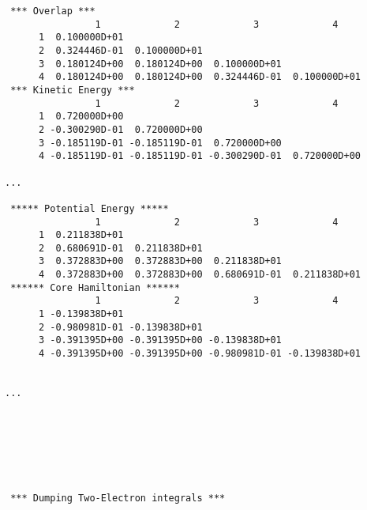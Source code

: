\documentclass[10pt]{ctexrep}
\begin{document}
\begin{verbatim}
 *** Overlap ***
                1             2             3             4
      1  0.100000D+01
      2  0.324446D-01  0.100000D+01
      3  0.180124D+00  0.180124D+00  0.100000D+01
      4  0.180124D+00  0.180124D+00  0.324446D-01  0.100000D+01
 *** Kinetic Energy ***
                1             2             3             4
      1  0.720000D+00
      2 -0.300290D-01  0.720000D+00
      3 -0.185119D-01 -0.185119D-01  0.720000D+00
      4 -0.185119D-01 -0.185119D-01 -0.300290D-01  0.720000D+00

...

 ***** Potential Energy *****
                1             2             3             4
      1  0.211838D+01
      2  0.680691D-01  0.211838D+01
      3  0.372883D+00  0.372883D+00  0.211838D+01
      4  0.372883D+00  0.372883D+00  0.680691D-01  0.211838D+01
 ****** Core Hamiltonian ******
                1             2             3             4
      1 -0.139838D+01
      2 -0.980981D-01 -0.139838D+01
      3 -0.391395D+00 -0.391395D+00 -0.139838D+01
      4 -0.391395D+00 -0.391395D+00 -0.980981D-01 -0.139838D+01


...







 *** Dumping Two-Electron integrals ***




\end{verbatim}
\end{document}
